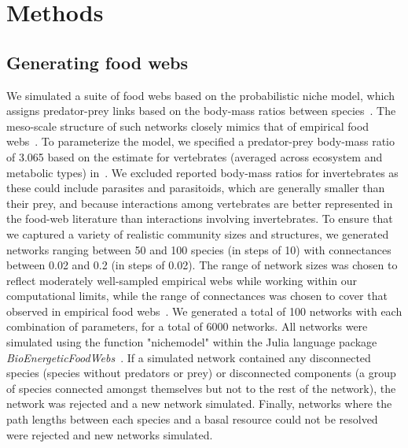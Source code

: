 \documentclass[12pt]{article}
\begin{document}
\section{Methods}

	\subsection*{Generating food webs}

		We simulated a suite of food webs based on the probabilistic niche model, which assigns predator-prey links based on the body-mass ratios between species~\citep{Williams2000,Delmas2017}. The meso-scale structure of such networks closely mimics that of empirical food webs~\citep{Stouffer2007}. To parameterize the model, we specified a predator-prey body-mass ratio of 3.065 based on the estimate for vertebrates (averaged across ecosystem and metabolic types) in~\citet{Brose2006}. We excluded reported body-mass ratios for invertebrates as these could include parasites and parasitoids, which are generally smaller than their prey, and because interactions among vertebrates are better represented in the food-web literature than interactions involving invertebrates. To ensure that we captured a variety of realistic community sizes and structures, we generated networks ranging between 50 and 100 species (in steps of 10) with connectances between 0.02 and 0.2 (in steps of 0.02). The range of network sizes was chosen to reflect moderately well-sampled empirical webs while working within our computational limits, while the range of connectances was chosen to cover that observed in empirical food webs~\citep{}. We generated a total of 100 networks with each combination of parameters, for a total of 6000 networks. All networks were simulated using the function "nichemodel" within the Julia language package \emph{BioEnergeticFoodWebs}~\citep{bioenergeticfw,Delmas2017}. If a simulated network contained any disconnected species (species without predators or prey) or disconnected components (a group of species connected amongst themselves but not to the rest of the network), the network was rejected and a new network simulated. Finally, networks where the path lengths between each species and a basal resource could not be resolved were rejected and new networks simulated.
\end{document}
